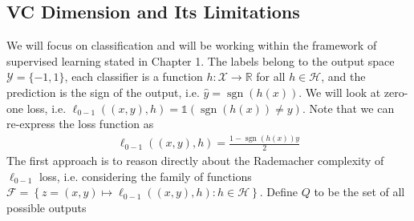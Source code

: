 \documentclass{article}
\begin{document}
\subsection{VC Dimension and Its Limitations}
We will focus on classification and will be working within the framework of supervised learning stated in Chapter 1. The labels belong to the output space $\mathcal{Y}=\{-1,1\}$, each classifier is a function $h: \mathcal{X} \rightarrow \mathbb{R}$ for all $h \in \mathcal{H}$, and the prediction is the sign of the output, i.e. $\hat{y}=\operatorname{sgn}(h(x)) .$ We will look at zero-one loss, i.e. $\ell_{0-1}((x, y), h)=\mathbb{1}(\operatorname{sgn}(h(x)) \neq y) .$ Note that we can re-express the loss function as
\begin{align*}
\ell_{0-1}((x, y), h)=\frac{1-\operatorname{sgn}(h(x)) y}{2}
\end{align*}
The first approach is to reason directly about the Rademacher complexity of $\ell_{0-1}$ loss, i.e. considering the family of functions $\mathcal{F}=\left\{z=(x, y) \mapsto \ell_{0-1}((x, y), h): h \in \mathcal{H}\right\} .$ Define $Q$ to be the set of all possible outputs
\end{document}
